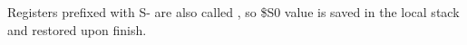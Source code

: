 


Registers prefixed with S- are also called , 
so \$S0 value is saved in the local stack
and restored upon finish.
